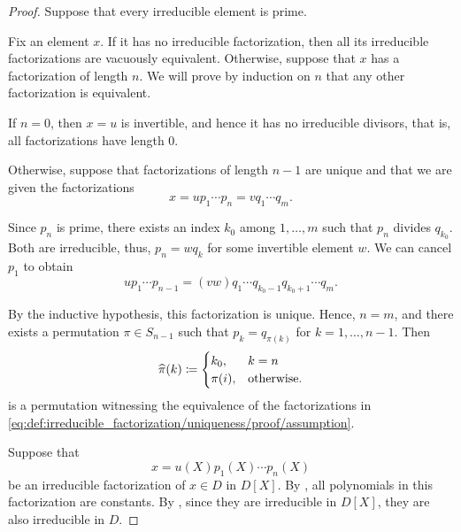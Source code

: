\begin{proof}
   Suppose that every irreducible element is prime.

  Fix an element \( x \). If it has no irreducible factorization, then all its irreducible factorizations are vacuously equivalent. Otherwise, suppose that \( x \) has a factorization of length \( n \). We will prove by induction on \( n \) that any other factorization is equivalent.

  If \( n = 0 \), then \( x = u \) is invertible, and hence it has no irreducible divisors, that is, all factorizations have length \( 0 \).

  Otherwise, suppose that factorizations of length \( n - 1 \) are unique and that we are given the factorizations
  \begin{equation}\label{eq:def:irreducible_factorization/uniqueness/proof/assumption}
    x = u p_1 \cdots p_n = v q_1 \cdots q_m.
  \end{equation}

  Since \( p_n \) is prime, there exists an index \( k_0 \) among \( 1, \ldots, m \) such that \( p_n \) divides \( q_{k_0} \). Both are irreducible, thus, \( p_n = w q_k \) for some invertible element \( w \). We can cancel \( p_1 \) to obtain
  \begin{equation*}
    u p_1 \cdots p_{n-1} = (vw) q_1 \cdots q_{k_0-1} q_{k_0+1} \cdots q_m.
  \end{equation*}

  By the inductive hypothesis, this factorization is unique. Hence, \( n = m \), and there exists a permutation \( \pi \in S_{n-1} \) such that \( p_k = q_{\pi(k)} \) for \( k = 1, \ldots, n - 1 \). Then
  \begin{equation*}
    \widehat{\pi}(k) \coloneqq \begin{cases}
      k_0,    & k = n \\
      \pi(i), & \T{otherwise.}
    \end{cases}
  \end{equation*}
  is a permutation witnessing the equivalence of the factorizations in \eqref{eq:def:irreducible_factorization/uniqueness/proof/assumption}.


  \SufficiencySubProof* Suppose that
  \begin{equation}\label{eq:thm:def:irreducible_factorization/polynomial_ring/sufficiency_assumption}
    x = u(X) p_1(X) \cdots p_n(X)
  \end{equation}
  be an irreducible factorization of \( x \in D \) in \( D[X] \). By , all polynomials in this factorization are constants. By , since they are irreducible in \( D[X] \), they are also irreducible in \( D \).


\end{proof}

